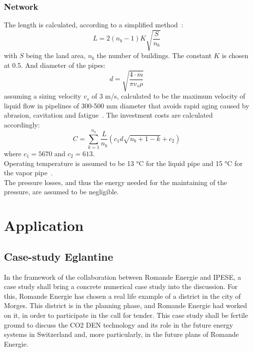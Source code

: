 \documentclass{article}
\begin{document}
\subsubsection{Network}\label{sss:net}
The length is calculated, according to a simplified method~\cite{girardinEnerGisGeographicalInformation2010}:
\begin{equation}
L = 2(n_{b}-1)K\sqrt{\frac{S}{n_{b}}}
\end{equation}
with $S$ being the land area, $n_{b}$ the number of buildings. The constant $K$ is chosen at 0.5.
And diameter of the pipes:
\begin{equation}
d = \sqrt{\frac{4\cdot \dot{m}}{\pi v_{s} \rho}}
\end{equation}
assuming a sizing velocity $v_{s}$ of 3 m/s, calculated to be the maximum velocity of liquid flow in pipelines of 300-500 mm diameter that avoids rapid aging caused by abrasion, cavitation and fatigue~\cite{henchozPerformanceProfitabilityPerspectives2015}.
The investment costs are calculated accordingly:
\begin{equation}
C = \sum_{k=1}^{n_{b}} \frac{L}{n_{b}} (c_{1} d \sqrt{n_{b}+1-k} + c_{2})
\end{equation}
where $c_{1} =5670 $ and $c_{2} = 613 $.\\

Operating temperature is assumed to be 13 \si{\celsius} for the liquid pipe and 15 \si{\celsius} for the vapor pipe~\cite{suciuEnergyautonomousCitiesUsing2016}.\\

The pressure losses, and thus the energy needed for the maintaining of the pressure, are assumed to be negligible.

\newpage
\section{Application}

\subsection{Case-study Eglantine}\label{ss:Eglantine}
In the framework of the collaboration between Romande Energie and IPESE, a case study shall bring a concrete numerical case study into the discussion. For this, Romande Energie has chosen a real life example of a district in the city of Morges. This district is in the planning phase, and Romande Energie had worked on it, in order to participate in the call for tender. This case study shall be fertile ground to discuss the CO2 DEN technology and its role in the future energy systems in Switzerland and, more particularly, in the future plans of Romande Energie.
\end{document}
